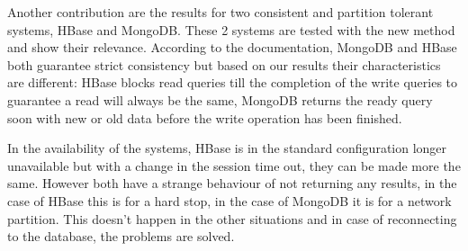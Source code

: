 \documentclass[10pt,conference,letterpaper]{IEEEtran}
\begin{document}
Another contribution are the results for two consistent and partition tolerant systems, HBase and MongoDB. These 2 systems are tested with the new method and show their relevance. According to the documentation, MongoDB and HBase both guarantee strict consistency but based on our results their characteristics are different: HBase blocks read queries till the completion of the write queries to guarantee a read will always be the same, MongoDB returns the ready query soon with new or old data before the write operation has been finished. 

In the availability of the systems, HBase is in the standard configuration longer unavailable but with a change in the session time out, they can be made more the same. However both have a strange behaviour of not returning any results, in the case of HBase this is for a hard stop, in the case of MongoDB it is for a network partition. This doesn't happen in the other situations and in case of reconnecting to the database, the problems are solved. 











\end{document}
